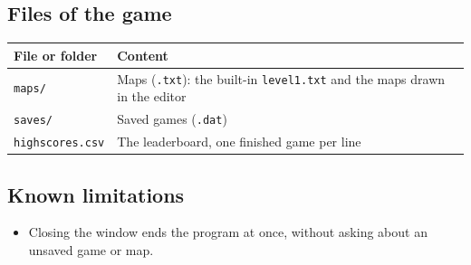 \documentclass[11pt, a4paper]{article}
\begin{document}
\subsection*{Files of the game}
\begin{tabular}{@{}ll@{}}
    \toprule
    \textbf{File or folder} & \textbf{Content} \\
    \midrule
    \texttt{maps/} & Maps (\texttt{.txt}): the built-in \texttt{level1.txt} and the maps drawn in the editor \\
    \texttt{saves/} & Saved games (\texttt{.dat}) \\
    \texttt{highscores.csv} & The leaderboard, one finished game per line \\
    \bottomrule
\end{tabular}

\subsection*{Known limitations}
\begin{itemize}
    \item Closing the window ends the program at once, without asking about an unsaved game or map.
\end{itemize}
\end{document}

